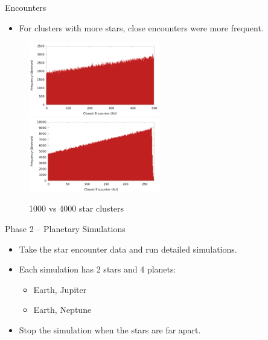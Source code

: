 \documentclass{beamer}
\begin{document}
\begin{frame}{Encounters}
    \begin{itemize}
        \item For clusters with more stars, close encounters were more frequent.
    \end{itemize}
    \begin{figure}
        \centering
        \caption{1000 vs 4000 star clusters}
        \includegraphics[width=2.25in]{encounter_distance_frequency_n1000} \\
        \includegraphics[width=2.25in]{encounter_distance_frequency_n4000}
    \end{figure}
\end{frame}

\begin{frame}{Phase 2 -- Planetary Simulations}
    \begin{itemize}
        \item Take the star encounter data and run detailed simulations.
        \item Each simulation has 2 stars and 4 planets:
            \begin{itemize}
            \item Earth, Jupiter
            \item Earth, Neptune
            \end{itemize}
        \item Stop the simulation when the stars are far apart.
    \end{itemize}
\end{frame}
\end{document}
